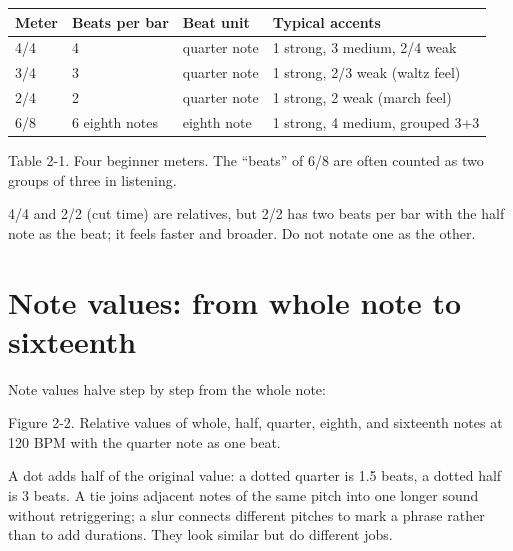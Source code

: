 \begin{center}
\small
\begin{tabular}{llll}
\toprule
Meter & Beats per bar & Beat unit & Typical accents \\
\midrule
4/4 & 4 & quarter note & 1 strong, 3 medium, 2/4 weak \\
3/4 & 3 & quarter note & 1 strong, 2/3 weak (waltz feel) \\
2/4 & 2 & quarter note & 1 strong, 2 weak (march feel) \\
6/8 & 6 eighth notes & eighth note & 1 strong, 4 medium, grouped 3+3 \\
\bottomrule
\end{tabular}

Table 2-1. Four beginner meters. The ``beats'' of 6/8 are often counted as two groups of three in listening.
\end{center}

4/4 and 2/2 (cut time) are relatives, but 2/2 has two beats per bar with the half note as the beat; it feels faster and broader. Do not notate one as the other.

\section{Note values: from whole note to sixteenth}

Note values halve step by step from the whole note:

\begin{center}

\small Figure 2-2. Relative values of whole, half, quarter, eighth, and sixteenth notes at 120 BPM with the quarter note as one beat.
\end{center}

A dot adds half of the original value: a dotted quarter is 1.5 beats, a dotted half is 3 beats. A tie joins adjacent notes of the same pitch into one longer sound without retriggering; a slur connects different pitches to mark a phrase rather than to add durations. They look similar but do different jobs.

